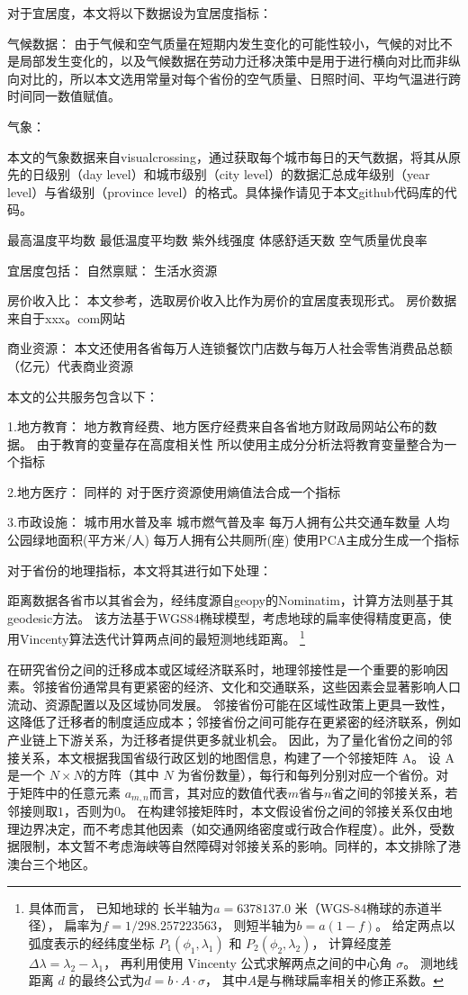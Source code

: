 \documentclass[a4paper, zihao=-4, fontset = mac, oneside]{ctexbook} %
\let\oldfootnote\footnote
\renewcommand{\footnote}[1]{%
  \oldfootnote{\setstretch{1.5}#1}%
}
\begin{document}
对于宜居度，本文将以下数据设为宜居度指标：

气候数据：
由于气候和空气质量在短期内发生变化的可能性较小，气候的对比不是局部发生变化的，以及气候数据在劳动力迁移决策中是用于进行横向对比而非纵向对比的，所以本文选用常量对每个省份的空气质量、日照时间、平均气温进行跨时间同一数值赋值。

气象：

本文的气象数据来自visualcrossing，通过获取每个城市每日的天气数据，将其从原先的日级别（day level）和城市级别（city level）的数据汇总成年级别（year level）与省级别（province level）的格式。具体操作请见于本文github代码库的代码。

最高温度平均数 最低温度平均数 紫外线强度 体感舒适天数  空气质量优良率


宜居度包括：
自然禀赋：
生活水资源


房价收入比：
本文参考\textcite{LiHuiFangJieFangJieShouRuBiYuLiuDongRenKouChangQiJuLiuYiYuanLaiZiLiuDongRenKouDeWeiGuanZhengJu2019}，选取房价收入比作为房价的宜居度表现形式。
房价数据来自于xxx。com网站

商业资源：
本文还使用各省每万人连锁餐饮门店数与每万人社会零售消费品总额（亿元）代表商业资源


本文的公共服务包含以下：

1.地方教育：
地方教育经费、地方医疗经费来自各省地方财政局网站公布的数据。
由于教育的变量存在高度相关性
所以使用主成分分析法将教育变量整合为一个指标

2.地方医疗：
同样的
对于医疗资源使用熵值法合成一个指标

3.市政设施：
城市用水普及率
城市燃气普及率
每万人拥有公共交通车数量
人均公园绿地面积(平方米/人)
每万人拥有公共厕所(座)
使用PCA主成分生成一个指标


对于省份的地理指标，本文将其进行如下处理：

距离数据各省市以其省会为，经纬度源自geopy的Nominatim，计算方法则基于其geodesic方法。
该方法基于WGS84椭球模型，考虑地球的扁率使得精度更高，使用Vincenty算法迭代计算两点间的最短测地线距离。
\footnote{
具体而言，
已知地球的
长半轴为$a = 6378137.0$ 米（WGS-84椭球的赤道半径），
扁率为$f = 1 / 298.257223563$，
则短半轴为$b = a(1 - f)$。
给定两点以弧度表示的经纬度坐标 $ P_1(\phi_1, \lambda_1) $ 和 $ P_2(\phi_2, \lambda_2) $，
计算经度差$\Delta\lambda = \lambda_2 - \lambda_1$，
再利用使用 Vincenty 公式求解两点之间的中心角 $\sigma$。
测地线距离 $d$ 的最终公式为$d = b \cdot A \cdot \sigma$，
其中$A$是与椭球扁率相关的修正系数。
}

在研究省份之间的迁移成本或区域经济联系时，地理邻接性是一个重要的影响因素。邻接省份通常具有更紧密的经济、文化和交通联系，这些因素会显著影响人口流动、资源配置以及区域协同发展。
邻接省份可能在区域性政策上更具一致性，这降低了迁移者的制度适应成本；邻接省份之间可能存在更紧密的经济联系，例如产业链上下游关系，为迁移者提供更多就业机会。
因此，为了量化省份之间的邻接关系，本文根据我国省级行政区划的地图信息，构建了一个邻接矩阵 A。
设 A 是一个 $N \times N$的方阵（其中 $N$ 为省份数量），每行和每列分别对应一个省份。对于矩阵中的任意元素 $a_{m,n}$而言，其对应的数值代表$m$省与$n$省之间的邻接关系，若邻接则取$1$，否则为$0$。
在构建邻接矩阵时，本文假设省份之间的邻接关系仅由地理边界决定，而不考虑其他因素（如交通网络密度或行政合作程度）。此外，受数据限制，本文暂不考虑海峡等自然障碍对邻接关系的影响。同样的，本文排除了港澳台三个地区。
\end{document}
